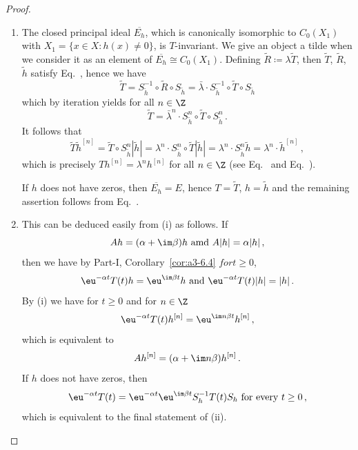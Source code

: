 \begin{proof}
\begin{enumerate}	
\item
The closed principal ideal $\overline{E_{h}}$, which is canonically isomorphic to $C_{0}(X_{1})$ with $X_{1} = \{x \in X \colon h(x) \neq 0\}$, is $T$-invariant.
	We give an object a tilde when we consider it as an element of\/ $\overline{E_{h}} \cong C_{0}(X_{1})$.
	Defining $\tilde{R} \coloneqq \lambda\tilde{T}$, then $\tilde{T}$, $\tilde{R}$, $\tilde{h}$ satisfy Eq.~, hence we have
	\begin{equation}\label{eq:b3-2.12}
		\tilde{T} = S_{\tilde{h}}^{-1} \circ \tilde{R} \circ S_{\tilde{h}} = \bar{\lambda} \cdot S_{\tilde{h}}^{-1} \circ \tilde{T} \circ S_{\tilde{h}}
	\end{equation}
	which by iteration yields for all $ n \in \Z $
	\begin{equation}\label{eq:b3-2.13}
		\tilde{T} = \bar{\lambda}^{n} \cdot S_{\tilde{h}}^{n} \circ \tilde{T} \circ S_{\tilde{h}}^{n}\,.
	\end{equation}
	It follows that
		\begin{equation*}
		\tilde{T}\tilde{h}^{[n]} = \tilde{T} \circ S_{\tilde{h}}^{n}|\tilde{h}| = \lambda^{n} \cdot S_{\tilde{h}}^{n} \circ \tilde{T}|\tilde{h}| 
		= \lambda^{n} \cdot S_{\tilde{h}}^{n}\tilde{h} = \lambda^{n} \cdot \tilde{h}^{[n]}\,,
	\end{equation*}
	which is precisely $Th^{[n]} = \lambda^{n}h^{[n]}$ for all $n \in \Z$ (see Eq.~ and Eq.~). 
	
	If\/ $h$ does not have zeros, then $\overline{E_{h}} = E$, hence $T = \tilde{T}$, $h = \tilde{h}$ and the remaining assertion follows from Eq.~.

\item 
    This can be deduced easily from (i) as follows. If
    \[
    Ah = (\alpha+\im\beta )h \text{ amd } A|h| = \alpha|h|\,,
    \] 
    then we have by Part-I, Corollary~\ref{cor:a3-6.4} $ for t \geq 0$,
	\[
	\eu^{-\alpha t}T(t)h = \eu^{\im\beta  t} h \text{ and } \eu^{-\alpha t}T(t)|h| = |h|\,.
	\]
	By (i) we have for $t \geq 0 $ and for $n \in \Z$ 
    \[\eu^{-\alpha t}T(t)h^{[n]} = \eu^{\im n\beta t}h^{[n]}\,, 
    \] 
    which is equivalent to 
    \[ 
    Ah^{[n]} = (\alpha+\im n\beta)h^{[n]}\,.
    \] 
	If\/ $h$ does not have zeros, then 
    \[
    \eu^{-\alpha t}T(t) = \eu^{-\alpha t}\eu^{\im\beta  t}S_{h}^{-1}T(t)S_{h} \text{ for every } t \geq 0\,,
    \] 
    which is equivalent to the final statement of (ii).
    \end{enumerate}
\end{proof}
